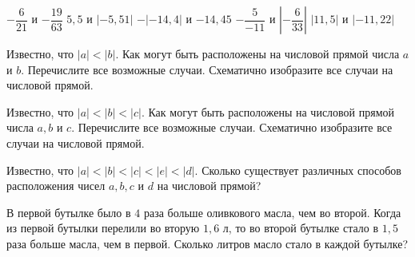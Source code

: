 \begin{class}[number=5-6]
\begin{listofex}
\begin{tasks}
			\task \( -\dfrac{6}{21} \) и \( -\dfrac{19}{63} \)
			\task \( 5,5 \) и \( |-5,51| \)
			\task \( -|-14,4| \) и \( -14,45 \)
			\task \( -\dfrac{5}{-11} \) и \( \left| -\dfrac{6}{33} \right| \)
			\task \( |11,5| \) и \( |-11,22| \)
		\end{tasks}
		\item Известно, что \( |a|<|b| \). Как могут быть расположены на числовой прямой числа \( a \) и \( b \). Перечислите все возможные случаи. Схематично изобразите все случаи на числовой прямой.
		\item Известно, что \( |a|<|b|<|c| \). Как могут быть расположены на числовой прямой числа \(a, b\) и \(c\). Перечислите все возможные случаи. Схематично изобразите все случаи на числовой прямой.
		\item Известно, что \( |a|<|b|<|c|<|e|<|d| \). Сколько существует различных способов расположения чисел \(a, b, c\) и \(d\) на числовой прямой?
		\item В первой бутылке было в \(4\) раза больше оливкового масла, чем во второй. Когда из первой бутылки перелили во вторую \(1,6\) л, то во второй бутылке стало в \(1,5\) раза больше масла, чем в первой. Сколько литров масло стало в каждой бутылке?
	\end{listofex}
\end{class}

